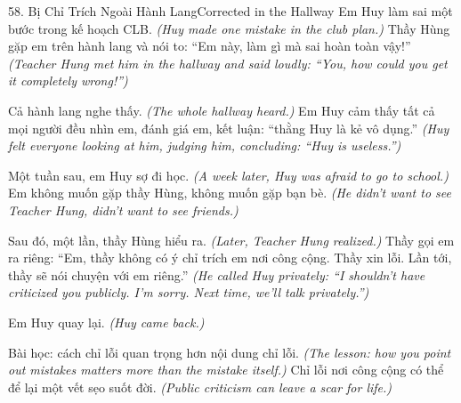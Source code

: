 \begin{truyen}{58. Bị Chỉ Trích Ngoài Hành Lang}{Corrected in the Hallway}
Em Huy làm sai một bước trong kế hoạch CLB.
\textit{(Huy made one mistake in the club plan.)}
Thầy Hùng gặp em trên hành lang và nói to: ``Em này, làm gì mà sai hoàn toàn vậy!''
\textit{(Teacher Hung met him in the hallway and said loudly: ``You, how could you get it completely wrong!'')}

Cả hành lang nghe thấy.
\textit{(The whole hallway heard.)}
Em Huy cảm thấy tất cả mọi người đều nhìn em, đánh giá em, kết luận: ``thằng Huy là kẻ vô dụng.''
\textit{(Huy felt everyone looking at him, judging him, concluding: ``Huy is useless.'')}

Một tuần sau, em Huy sợ đi học.
\textit{(A week later, Huy was afraid to go to school.)}
Em không muốn gặp thầy Hùng, không muốn gặp bạn bè.
\textit{(He didn't want to see Teacher Hung, didn't want to see friends.)}

Sau đó, một lần, thầy Hùng hiểu ra.
\textit{(Later, Teacher Hung realized.)}
Thầy gọi em ra riêng: ``Em, thầy không có ý chỉ trích em nơi công cộng. Thầy xin lỗi. Lần tới, thầy sẽ nói chuyện với em riêng.''
\textit{(He called Huy privately: ``I shouldn't have criticized you publicly. I'm sorry. Next time, we'll talk privately.'')}

Em Huy quay lại.
\textit{(Huy came back.)}

Bài học: cách chỉ lỗi quan trọng hơn nội dung chỉ lỗi.
\textit{(The lesson: how you point out mistakes matters more than the mistake itself.)}
Chỉ lỗi nơi công cộng có thể để lại một vết sẹo suốt đời.
\textit{(Public criticism can leave a scar for life.)}
\end{truyen}

